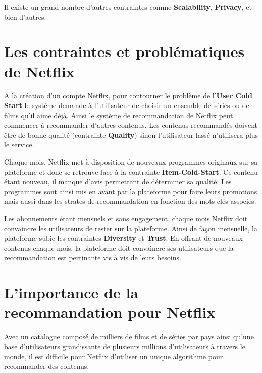\vspace{5mm}

Il existe un grand nombre d’autres contraintes comme \textbf{Scalability}, \textbf{Privacy}, et bien d’autres.



\section{Les contraintes et problématiques de Netflix}


A la création d'un compte Netflix, pour contourner le problème de l’\textbf{User Cold Start} le système demande à l'utilisateur de choisir un ensemble de séries ou de films qu'il aime déjà. Ainsi le système de recommandation de Netflix peut commencer à recommander d'autres contenus. Les contenus recommandés doivent être de bonne qualité (contrainte \textbf{Quality}) sinon l’utilisateur lassé n’utilisera plus le service. 

\vspace{5mm}

Chaque mois, Netflix met à disposition de nouveaux programmes originaux sur sa plateforme et donc se retrouve face à la contrainte \textbf{Item-Cold-Start}. Ce contenu étant nouveau, il manque d’avis permettant de déterminer sa qualité. Les programmes sont ainsi mis en avant par la plateforme pour faire leurs promotions mais aussi dans les strates de recommandation en fonction des mots-clés associés. 

\vspace{5mm}

Les abonnements étant mensuels et sans engagement, chaque mois Netflix doit convaincre les utilisateurs de rester sur la plateforme. Ainsi de façon mensuelle, la plateforme subie les contraintes \textbf{Diversity} et \textbf{Trust}. En offrant de nouveaux contenus chaque mois, la plateforme doit convaincre ses utilisateurs que la recommandation est pertinante vis à vis de leurs besoins.

 



\section{L'importance de la recommandation pour Netflix}


Avec un catalogue composé de milliers de films et de séries par pays ainsi qu’une base d’utilisateurs grandissante de plusieurs millions d’utilisateurs à travers le monde, il est difficile pour Netflix d’utiliser un unique algorithme pour recommander des contenus.

